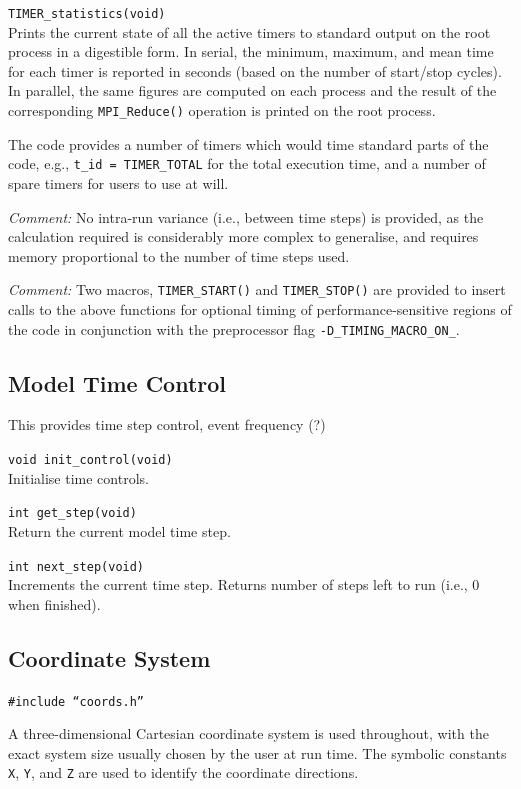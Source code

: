 \texttt{TIMER\_statistics(void)}\\
Prints the current state of all the active timers to standard
output on the root process in a digestible form. In serial,
the minimum, maximum, and mean time for each timer is reported
in seconds (based on the number of start/stop cycles). In
parallel, the same figures are computed on each process and the
result of the corresponding \texttt{MPI\_Reduce()} operation is
printed on the root process.

The code provides a number of timers which would time standard
parts of the code, e.g., \texttt{t\_id = TIMER\_TOTAL} for the
total execution time, and a number of spare timers for users to
use at will.


\textit{Comment:}
No intra-run variance (i.e., between time steps) is provided, as the
calculation required is considerably more complex to generalise, and
requires memory proportional to the number of time steps used.


\textit{Comment:}
Two macros, \texttt{TIMER\_START()} and \texttt{TIMER\_STOP()} are
provided to insert calls to the above functions for optional timing
of performance-sensitive regions
of the code in conjunction with the preprocessor flag
\texttt{-D\_TIMING\_MACRO\_ON\_}.


\subsection{Model Time Control}

This provides time step control, event frequency (?)

\texttt{void init\_control(void)}\\
Initialise time controls.

\texttt{int get\_step(void)}\\
Return the current model time step.

\texttt{int next\_step(void)}\\
Increments the current time step. Returns number of steps left
to run (i.e., 0 when finished).



\subsection{Coordinate System}

\texttt{\#include ``coords.h''}

A three-dimensional Cartesian coordinate system is used throughout,
with the exact system size usually chosen by the user at run time.
The symbolic constants \texttt{X}, \texttt{Y}, and \texttt{Z} are
used to identify the coordinate directions.

